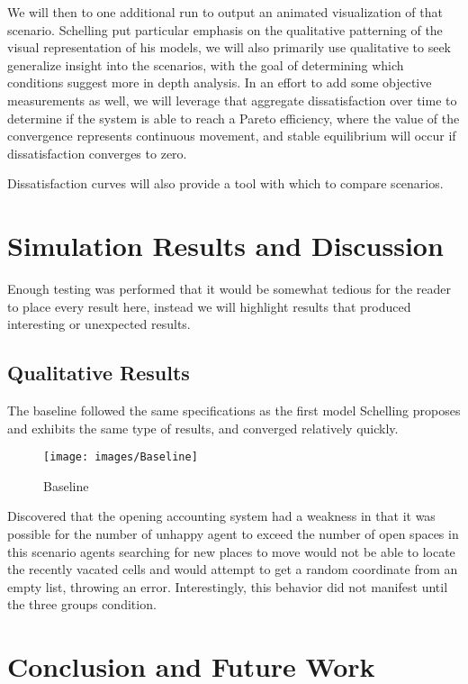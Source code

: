 \documentclass[sigplan,nonacm]{acmart}
\begin{document}
We will then to one additional run to output an animated visualization of that scenario.
Schelling put particular emphasis on the qualitative patterning of the visual representation of his models,
we will also primarily use qualitative to seek generalize insight into the scenarios, with the goal of 
determining which conditions suggest more in depth analysis.
In an effort to add some objective measurements as well, we will leverage that aggregate dissatisfaction over time
to determine if the system is able to reach a Pareto efficiency, where the value of the convergence represents
continuous movement, and stable equilibrium will occur if dissatisfaction converges to zero.

Dissatisfaction curves will also provide a tool with which to compare scenarios.

\section{Simulation Results and Discussion}

Enough testing was performed that it would be somewhat tedious for the reader to place every result here,
instead we will highlight results that produced interesting or unexpected results.

\subsection{Qualitative Results}

The baseline followed the same specifications as the first model Schelling proposes and exhibits the same type of results,
and converged relatively quickly.

\begin{figure}
	\centering
	\texttt{[image: images/Baseline]}
	\caption{Baseline}
	\label{fig:baseline}
\end{figure}




Discovered that the opening accounting system had a weakness in that it was possible for the number of unhappy agent to exceed the number of open spaces
in this scenario agents searching for new places to move would not be able to locate the recently vacated cells and would
attempt to get a random coordinate from an empty list, throwing an error. Interestingly, this behavior did not manifest until the three groups condition.


\section{Conclusion and Future Work}
\end{document}
